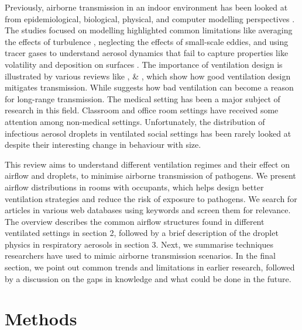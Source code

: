\documentclass[preprint,12pt]{elsarticle}
\begin{document}
Previously, airborne transmission in an indoor environment has been looked at from epidemiological, biological, physical, and computer modelling perspectives \cite{argyropoulos2023airborne}. The studies focused on modelling highlighted common limitations like averaging the effects of turbulence \cite{mirzaie2021covid,dbouk2020respiratory},  neglecting the effects of small-scale eddies, and using tracer gases to understand aerosol dynamics that fail to capture properties like volatility and deposition on surfaces \cite{rayegan2022review, zhao2022airborne}. The importance of ventilation design is illustrated by various reviews like \cite{luongo2016role}, \cite{hobeika2023assessing} \& \cite{thornton2022impact}, which show how good ventilation design mitigates transmission. While \cite{correia2020airborne} suggests how bad ventilation can become a reason for long-range transmission. The medical setting has been a major subject of research in this field. Classroom and office room settings have received some attention among non-medical settings. Unfortunately, the distribution of infectious aerosol droplets in ventilated social settings has been rarely looked at despite their interesting change in behaviour with size.

This review aims to understand different ventilation regimes and their effect on airflow and droplets, to minimise airborne transmission of pathogens. We present airflow distributions in rooms with occupants, which helps design better ventilation strategies and reduce the risk of exposure to pathogens. We search for articles in various web databases using keywords and screen them for relevance. The overview describes the common airflow structures found in different ventilated settings in section 2, followed by a brief description of the droplet physics in respiratory aerosols in section 3. Next, we summarise techniques researchers have used to mimic airborne transmission scenarios. In the final section, we point out common trends and limitations in earlier research, followed by a discussion on the gaps in knowledge and what could be done in the future.

\section{Methods}
\end{document}
